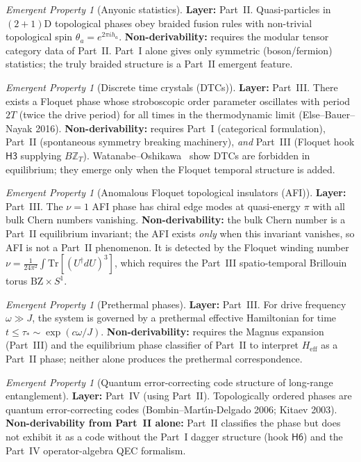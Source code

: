 \documentclass[12pt]{article}
\theoremstyle{definition}
\theoremstyle{remark}
\newtheorem{emerg}[theorem]{Emergent Property}
\newcommand{\Tr}{\mathrm{Tr}}
\newcommand{\Z}{\mathbb{Z}}
\begin{document}
\begin{emerg}[Anyonic statistics]
\label{em:anyon}
\textbf{Layer:} Part~II. Quasi-particles in $(2{+}1)$D topological phases obey
braided fusion rules with non-trivial topological spin $\theta_a = e^{2\pi i
h_a}$. \textbf{Non-derivability:} requires the modular tensor category data
of Part~II. Part~I alone gives only symmetric (boson/fermion) statistics; the
truly braided structure is a Part~II emergent feature.
\end{emerg}

\begin{emerg}[Discrete time crystals (DTCs)]
\label{em:dtc}
\textbf{Layer:} Part~III. There exists a Floquet phase whose stroboscopic
order parameter oscillates with period $2T$ (twice the drive period) for all
times in the thermodynamic limit (Else--Bauer--Nayak 2016).
\textbf{Non-derivability:} requires Part~I (categorical formulation),
Part~II (spontaneous symmetry breaking machinery), \emph{and} Part~III
(Floquet hook $\mathsf{H3}$ supplying $B\Z_T$). Watanabe--Oshikawa~\cite{watanabe2015} show DTCs
are forbidden in equilibrium; they emerge only when the Floquet temporal
structure is added.
\end{emerg}

\begin{emerg}[Anomalous Floquet topological insulators (AFI)]
\label{em:afi}
\textbf{Layer:} Part~III. The $\nu = 1$ AFI phase has chiral edge modes at
quasi-energy $\pi$ with all bulk Chern numbers vanishing.
\textbf{Non-derivability:} the bulk Chern number is a Part~II equilibrium
invariant; the AFI exists \emph{only} when this invariant vanishes, so AFI is
not a Part~II phenomenon. It is detected by the Floquet winding number
$\nu = \frac{1}{24\pi^2} \int \Tr[(U^\dagger dU)^3]$, which requires the
Part~III spatio-temporal Brillouin torus $\mathrm{BZ} \times S^1$.
\end{emerg}

\begin{emerg}[Prethermal phases]
\label{em:preth}
\textbf{Layer:} Part~III. For drive frequency $\omega \gg J$, the system is
governed by a prethermal effective Hamiltonian for time $t \leq \tau_* \sim
\exp(c \omega/J)$. \textbf{Non-derivability:} requires the Magnus expansion
(Part~III) and the equilibrium phase classifier of Part~II to interpret
$H_{\mathrm{eff}}$ as a Part~II phase; neither alone produces the prethermal
correspondence.
\end{emerg}

\begin{emerg}[Quantum error-correcting code structure of long-range
  entanglement]
\label{em:qec}
\textbf{Layer:} Part~IV (using Part~II). Topologically ordered phases are
quantum error-correcting codes (Bombin--Mart\'{\i}n-Delgado 2006; Kitaev 2003).
\textbf{Non-derivability from Part~II alone:} Part~II classifies the phase but
does not exhibit it as a code without the Part~I dagger structure
(hook $\mathsf{H6}$) and the Part~IV operator-algebra QEC formalism.
\end{emerg}
\end{document}
